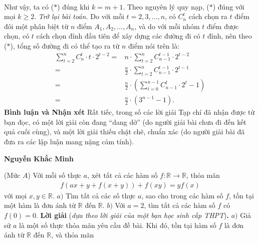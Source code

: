 \begin{multicols}{2}
\begin{align*}
	\end{align*}
	Như vậy, ta có ($*$) đúng khi $k = m + 1$.
	\vskip 0.05cm
	Theo nguyên lý quy nạp, ($*$) đúng với mọi $k \ge 2$.
	\vskip 0.05cm
	\textit{Trở lại bài toán.}
	\vskip 0.05cm
	Do với mỗi $t = 2, 3, \ldots, n$, có $C^t_n$  cách chọn ra $t$ điểm đôi một phân biệt từ $n$ điểm  $A_1,  A_2, \ldots,  A_n$, và do với mỗi nhóm $t$ điểm được chọn, có $t$ cách chọn đỉnh đầu tiên để xây dựng các đường đi có $t$ đỉnh, nên theo ($*$), tổng số đường đi có thể tạo ra từ $n$ điểm nói trên là:
	\begin{align*}
		\sum\limits_{t = 2}^n {C_n^t \cdot t \cdot {2^{t - 2}}}  =& n \cdot \sum\limits_{t = 2}^n {C_{n - 1}^{t - 1} \cdot {2^{t - 2}}}  \\
		=& \frac{n}{2} \cdot \sum\limits_{t = 2}^n {C_{n - 1}^{t - 1} \cdot {2^{t - 1}}} \\
		=& \frac{n}{2} \!\cdot\! \left( {\sum\limits_{t = 0}^{n - 1} {C_{n - 1}^t \!\cdot\! {2^t}}  - 1} \!\!\right) \\
		= &\frac{n}{2} \cdot \left( {{3^{n - 1}} - 1} \right).
	\end{align*}
	\textbf{\color{thachthuctoanhoc}Bình luận và Nhận xét}
	\vskip 0.05cm
	Rất tiếc, trong số các lời giải Tạp chí đã nhận được từ bạn đọc, có một lời giải còn đang “dang dở” (do người giải bài chưa đi đến kết quả cuối cùng), và một lời giải thiếu chặt chẽ, chuẩn xác (do người giải bài đã đưa ra các lập luận mang nặng cảm tính).
	\begin{flushright}
		\textbf{\color{thachthuctoanhoc}Nguyễn Khắc Minh}
	\end{flushright}
	{}
	(Mức $A$) Với mỗi số thực $a$, xét tất cả các hàm số $f: \mathbb{R} \to \mathbb{R}$, thỏa mãn
	\begin{align*}
		f\left( {ax + y + f\left( {x + y} \right)} \right) + f\left( {xy} \right) = yf\left( x \right)
	\end{align*}
	với mọi $x, y \in \mathbb{R}$.
	\vskip 0.05cm
	$a)$ Tìm tất cả các số thực $a$, sao cho trong các hàm số $f$, tồn tại một hàm là đơn ánh từ $\mathbb{R}$  đến $\mathbb{R}$.
	\vskip 0.05cm
	$b)$ Với $a = 2$, tìm tất cả các hàm số $f$ có $f(0) = 0$.
	\vskip 0.05cm 
	\textbf{\color{thachthuctoanhoc}Lời giải} (\textit{dựa theo lời giải của một bạn học sinh cấp THPT})\textbf{\color{thachthuctoanhoc}.}
	\vskip 0.05cm
	$a)$ Giả sử $a$ là một số thực thỏa mãn yêu cầu đề bài. Khi đó, tồn tại hàm số $f$ là đơn ánh từ  $\mathbb{R}$ đến  $\mathbb{R}$, và thỏa mãn
	\begin{align*}

\end{align*}
\end{multicols}
